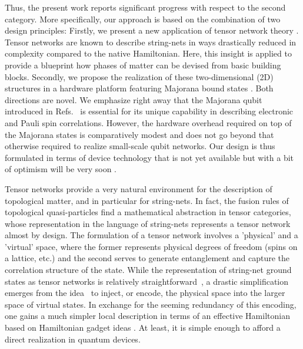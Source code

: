 \documentclass[twocolumn,floats,prx,showpacs]{revtex4-1}
\begin{document}
Thus, the present work reports significant progress with respect to the second category. More specifically, our approach is based on the combination of two design principles: Firstly, we present a new application of
 tensor network theory \cite{Orus-AnnPhys-2014,AreaReview,VerstraeteBig,SchuchReview}.
 Tensor networks are known to describe string-nets in ways drastically reduced in complexity compared to the native Hamiltonian. Here,
  this insight is applied to provide
 a blueprint how phases of matter can be devised from basic building blocks.
Secondly, we propose the realization of these two-dimensional (2D) structures in a hardware platform featuring Majorana bound states \cite{Alicea2012,Leijnse2012,Beenakker2013,Sarma2015,Aguado2017,Lutchyn2018,Mourik2012,Albrecht2016,Deng2016,Nichele2017,Gazi2017,Zhang2018}. Both directions are novel.  We emphasize right away that the Majorana qubit introduced in Refs.~\cite{Beri2012,Beri2013,Altland2013,Plugge2017,Karzig2017} is essential for its unique capability in describing electronic and Pauli spin correlations. However, the hardware overhead required on top of the Majorana states is comparatively modest and does not go beyond that otherwise required to realize small-scale qubit networks. Our design is thus formulated in terms of device technology that is not yet available  but with a bit of optimism will be very soon \cite{Lutchyn2018}.

Tensor networks provide a very natural environment for the description of topological matter, and in particular for string\nobreakdash -nets. In fact, the fusion rules of topological quasi-particles find a mathematical abstraction in tensor categories,  whose representation in  the language of string-nets represents a tensor network almost by design. The formulation of a tensor network involves a   'physical' and a 'virtual' space, where the former represents physical  degrees of freedom (spins on a lattice, etc.) and the second serves to generate entanglement and capture the correlation structure of the state.  While the representation of string-net ground states as tensor networks is relatively straightforward~\cite{Gu2009,Buerschaper2009}, a drastic simplification emerges from the idea~\cite{Schuch_MPS,1409.2150,FermionicMPO,PhysRevB.95.245127} to inject, or encode, the physical space into the larger space of virtual states. In exchange for the seeming redundancy of this encoding, one gains a much simpler local description in terms of an effective Hamiltonian \cite{Brell2014PEPS} based on Hamiltonian gadget ideas \cite{Kempe-SIAM-2006, PhysRevA.77.062329}. At least, it is simple enough to afford a direct realization in quantum devices.
\end{document}

